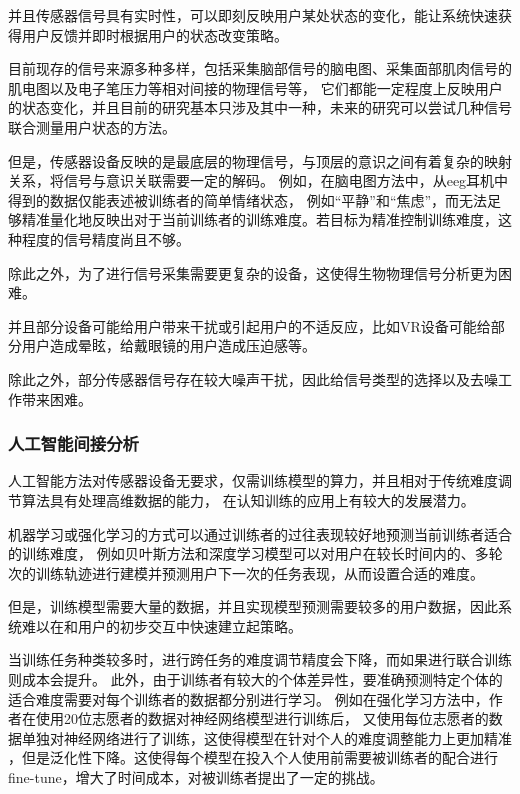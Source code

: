 \documentclass[12pt]{article}
\begin{document}
            并且传感器信号具有实时性，可以即刻反映用户某处状态的变化，能让系统快速获得用户反馈并即时根据用户的状态改变策略。

            目前现存的信号来源多种多样，包括采集脑部信号的脑电图、采集面部肌肉信号的肌电图以及电子笔压力等相对间接的物理信号等，
            它们都能一定程度上反映用户的状态变化，并且目前的研究基本只涉及其中一种，未来的研究可以尝试几种信号联合测量用户状态的方法。

            但是，传感器设备反映的是最底层的物理信号，与顶层的意识之间有着复杂的映射关系，将信号与意识关联需要一定的解码。
            例如，在脑电图方法中，从eeg耳机中得到的数据仅能表述被训练者的简单情绪状态，
            例如“平静”和“焦虑”，而无法足够精准量化地反映出对于当前训练者的训练难度。若目标为精准控制训练难度，这种程度的信号精度尚且不够。

            除此之外，为了进行信号采集需要更复杂的设备，这使得生物物理信号分析更为困难。

            并且部分设备可能给用户带来干扰或引起用户的不适反应，比如VR设备可能给部分用户造成晕眩，给戴眼镜的用户造成压迫感等。

            除此之外，部分传感器信号存在较大噪声干扰，因此给信号类型的选择以及去噪工作带来困难。
            
            \subsubsection{人工智能间接分析}
            人工智能方法对传感器设备无要求，仅需训练模型的算力，并且相对于传统难度调节算法具有处理高维数据的能力，
            在认知训练的应用上有较大的发展潜力。

            机器学习或强化学习的方式可以通过训练者的过往表现较好地预测当前训练者适合的训练难度，
            例如贝叶斯方法和深度学习模型可以对用户在较长时间内的、多轮次的训练轨迹进行建模并预测用户下一次的任务表现，从而设置合适的难度。

            但是，训练模型需要大量的数据，并且实现模型预测需要较多的用户数据，因此系统难以在和用户的初步交互中快速建立起策略。
            
            当训练任务种类较多时，进行跨任务的难度调节精度会下降，而如果进行联合训练则成本会提升。
            此外，由于训练者有较大的个体差异性，要准确预测特定个体的适合难度需要对每个训练者的数据都分别进行学习。
            例如在强化学习方法中，作者在使用20位志愿者的数据对神经网络模型进行训练后，
            又使用每位志愿者的数据单独对神经网络进行了训练，这使得模型在针对个人的难度调整能力上更加精准
            ，但是泛化性下降。这使得每个模型在投入个人使用前需要被训练者的配合进行fine-tune，增大了时间成本，对被训练者提出了一定的挑战。
            
\end{document}

